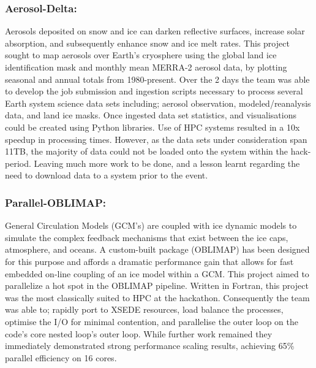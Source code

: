 \documentclass[conference]{IEEEtran}
\begin{document}
\subsubsection{Aerosol-Delta:}
Aerosols deposited on snow and ice can darken reflective surfaces, increase solar absorption, and subsequently enhance snow and ice melt rates. This project sought to map aerosols over Earth's cryosphere using the global land ice identification mask and monthly mean MERRA-2 aerosol data, by plotting seasonal and annual totals from 1980-present. Over the 2 days the team was able to develop the job submission and ingestion scripts necessary to process several Earth system science data sets including; aerosol observation, modeled/reanalysis data, and land ice masks.  Once ingested data set statistics, and visualisations could be created using Python libraries.  Use of HPC systems resulted in a 10x speedup in processing times.  However, as the data sets under consideration span 11TB, the majority of data could not be loaded onto the system within the hack-period. Leaving much more work to be done, and a lesson learnt regarding the need to download data to a system prior to the event.

\subsubsection{Parallel-OBLIMAP:}
General Circulation Models (GCM's) are coupled with ice dynamic models to simulate the complex feedback mechanisms that exist between the ice caps, atmosphere, and oceans. A custom-built package (OBLIMAP\cite{Reerink2016-xr}) has been designed for this purpose and affords a dramatic performance gain that allows for fast embedded on-line coupling of an ice model within a GCM. This project aimed to parallelize a hot spot in the OBLIMAP pipeline.  Written in Fortran, this project was the most classically suited to HPC at the hackathon.  Consequently the team was able to; rapidly port to XSEDE resources, load balance the processes, optimise the I/O for minimal contention, and parallelise the outer loop on the code’s core nested loop’s outer loop.  While further work remained they immediately demonstrated strong performance scaling results, achieving 65\% parallel efficiency on 16 cores.
\end{document}

